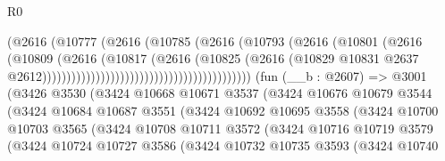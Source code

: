 \begin{lexlean}{R0}
\begin{coremodule}
                                                          (@2616
                                                            (@10777
                                                              (@2616
                                                                (@10785
                                                                  (@2616
                                                                    (@10793
                                                                      (@2616
                                                                        (@10801
                                                                          (@2616
                                                                            (@10809
                                                                              (@2616
                                                                                (@10817
                                                                                  (@2616
                                                                                    (@10825
                                                                                      (@2616
                                                                                        (@10829
                                                                                          @10831
                                                                                          @2637
                                                                                          @2612)))))))))))))))))))))))))))))))))))))))))))
    (fun (__b : @2607) =>
    @3001
      (@3426
        @3530
        (@3424
          @10668
          @10671
          @3537
          (@3424
            @10676
            @10679
            @3544
            (@3424
              @10684
              @10687
              @3551
              (@3424
                @10692
                @10695
                @3558
                (@3424
                  @10700
                  @10703
                  @3565
                  (@3424
                    @10708
                    @10711
                    @3572
                    (@3424
                      @10716
                      @10719
                      @3579
                      (@3424
                        @10724
                        @10727
                        @3586
                        (@3424
                          @10732
                          @10735
                          @3593
                          (@3424
                            @10740

\end{coremodule}
\end{lexlean}
